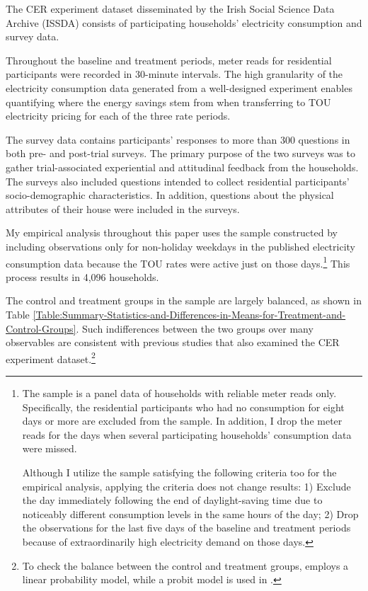 The CER experiment dataset disseminated by the Irish Social Science Data Archive (ISSDA) consists of participating households' electricity consumption and survey data. 

Throughout the baseline and treatment periods, meter reads for residential participants were recorded in 30-minute intervals. The high granularity of the electricity consumption data generated from a well-designed experiment enables quantifying where the energy savings stem from when transferring to TOU electricity pricing for each of the three rate periods. 

The survey data contains participants' responses to more than 300 questions in both pre- and post-trial surveys. The primary purpose of the two surveys was to gather trial-associated experiential and attitudinal feedback from the households. The surveys also included questions intended to collect residential participants' socio-demographic characteristics. In addition, questions about the physical attributes of their house were included in the surveys. 

My empirical analysis throughout this paper uses the sample constructed by including observations only for non-holiday weekdays in the published electricity consumption data because the TOU rates were active just on those days.\footnote{The sample is a panel data of households with reliable meter reads only. Specifically, the residential participants who had no consumption for eight days or more are excluded from the sample. In addition, I drop the meter reads for the days when several participating households' consumption data were missed. \par
Although I utilize the sample satisfying the following criteria too for the empirical analysis, applying the criteria does not change results: 1) Exclude the day immediately following the end of daylight-saving time due to noticeably different consumption levels in the same hours of the day; 2) Drop the observations for the last five days of the baseline and treatment periods because of extraordinarily high electricity demand on those days.} This process results in 4,096 households.

The control and treatment groups in the sample are largely balanced, as shown in Table \ref{Table:Summary-Statistics-and-Differences-in-Means-for-Treatment-and-Control-Groups}. Such indifferences between the two groups over many observables are consistent with previous studies that also examined the CER experiment dataset.\footnote{To check the balance between the control and treatment groups, \cite{Peaking-Interest:How-Awareness-Drives-the-Effectiveness-of-Time-of-Use-Electricity-Pricing} employs a linear probability model, while a probit model is used in \cite{The-Effect-of-Information-on-TOU-Electricity-Use:An-Irish-Residential-Study}.} 


